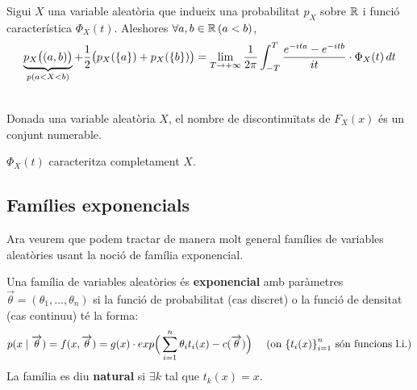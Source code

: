 \begin{thm}[(d'inversió)]
  Sigui $X$ una variable aleatòria que indueix una probabilitat $p_{X}$ sobre $\mathbb{R}$ i funció característica $\Phi_{X}(t)$. Aleshores $\forall a,b\in \mathbb{R} \, (a<b)$,
  \[
    \underbrace{p_{X}\big((a,b)\big)}_{p(a<X<b)} + \frac{1}{2}\big(p_{X}(\left\{a\right\})+p_{X}(\left\{b\right\}) \big) = \lim_{T\to+\infty}\frac{1}{2\pi}\int_{-T}^{T}\frac{e^{-ita}-e^{-itb}}{it}\cdot\Phi_{X}(t) \, dt
  \]
\end{thm}

\begin{lema} \-\\
  Donada una variable aleatòria $X$, el nombre de discontinuïtats de $F_{X}(x)$ és un conjunt numerable.
\end{lema}

\begin{col}
  $\Phi_{X}(t)$ caracteritza completament $X$.
\end{col}

\subsection{Famílies exponencials}

Ara veurem que podem tractar de manera molt general famílies de variables aleatòries usant la noció de família exponencial.

\begin{defi}
  Una família de variables aleatòries és \textbf{exponencial} amb paràmetres $\overrightarrow{\theta} = (\theta_{1},\ldots,\theta_{n})$ si la funció de probabilitat (cas discret) o la funció de densitat (cas continuu) té la forma:
  \[
    p(x\mid \overrightarrow{\theta}) = f(x,\overrightarrow{\theta}) = g(x)\cdot exp\Big(\sum_{i=1}^{n}\theta_{i}t_{i}(x)-c(\overrightarrow{\theta})\Big) \quad \text{ (on $\left\{t_{i}(x)\right\}_{i=1}^{n}$ són funcions l.i.)}
  \]
  La família es diu \textbf{natural} si $\exists k$ tal que $t_{k}(x)=x$.
\end{defi}
